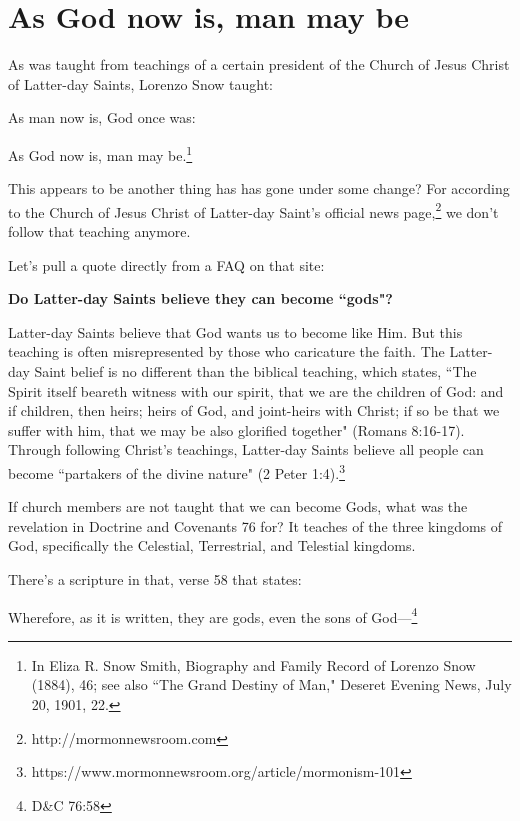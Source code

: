 \section{As God now is, man may be}

As was taught from teachings of a certain president of the Church of Jesus
Christ of Latter-day Saints, Lorenzo Snow taught:

\begin{displayquote}
As man now is, God once was:

As God now is, man may be.\footnote{In Eliza R. Snow Smith, Biography and 
Family Record of Lorenzo Snow (1884), 46; see also ``The Grand Destiny of Man," 
Deseret Evening News, July 20, 1901, 22.}
\end{displayquote}

This appears to be another thing has has gone under some change? For according
to the Church of Jesus Christ of Latter-day Saint's official news 
page,\footnote{http://mormonnewsroom.com} we don't follow that teaching anymore.

Let's pull a quote directly from a FAQ on that site:

\begin{displayquote}
\textbf{Do Latter-day Saints believe they can become ``gods"?}

Latter-day Saints believe that God wants us to become like Him. But this 
teaching is often misrepresented by those who caricature the faith. 
The Latter-day Saint belief is no different than the biblical teaching, 
which states, ``The Spirit itself beareth witness with our spirit, 
that we are the children of God: and if children, then heirs; heirs of God, 
and joint-heirs with Christ; if so be that we suffer with him, that we may be 
also glorified together" (Romans 8:16-17). Through following Christ's 
teachings, Latter-day Saints believe all people can become ``partakers of the 
divine nature"
(2 Peter 1:4).\footnote{https://www.mormonnewsroom.org/article/mormonism-101}
\end{displayquote}

If church members are not taught that we can become Gods, what was the 
revelation in Doctrine and Covenants 76 for? It teaches of the three kingdoms
of God, specifically the Celestial, Terrestrial, and Telestial kingdoms.

There's a scripture in that, verse 58 that states:

\begin{displayquote}
Wherefore, as it is written, they are gods, even the sons of 
God—\footnote{D\&C 76:58}
\end{displayquote}

